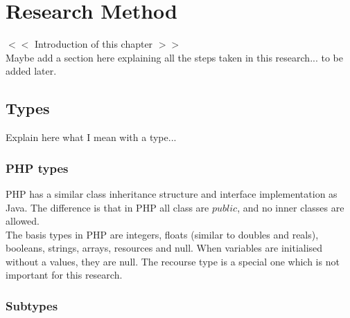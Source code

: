 \documentclass[../main.tex]{subfiles}
\begin{document}
    \chapter{Research Method}\label{chap:research_method}
    $<<$ Introduction of this chapter $>>$
    \\
    Maybe add a section here explaining all the steps taken in this research... to be added later.
    
    \section{Types}
    Explain here what I mean with a type...
    
    \subsection{PHP types}
    PHP has a similar class inheritance structure and interface implementation as Java.
    The difference is that in PHP all class are $public$, and no inner classes are allowed. 
    \\
    The basis types in PHP are integers, floats (similar to doubles and reals), booleans, strings, arrays, resources and null.
    When variables are initialised without a values, they are null. The recourse type is a special one which is not important for this research.
  

  
    \subsection{Subtypes}
 
\end{document}
